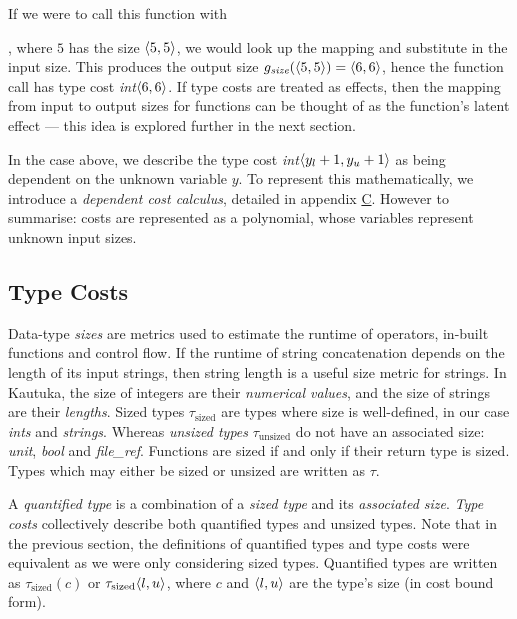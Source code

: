 If we were to call this function with , where \( 5 \) has the size \( \langle{5, 5}\rangle \), we would look up the mapping and substitute in the input size. This produces the output size \( g_{\textit{size}}(\langle{5, 5}\rangle) = \langle{6, 6}\rangle \), hence the function call has type cost \textit{int}\( \langle{6, 6}\rangle \). If type costs are treated as effects, then the mapping from input to output sizes for functions can be thought of as the function's latent effect --- this idea is explored further in the next section.

In the case above, we describe the type cost \textit{int}\( \langle{y_l + 1, y_u + 1}\rangle \) as being dependent on the unknown variable \( y \). To represent this mathematically, we introduce a \textit{dependent cost calculus}, detailed in appendix \hyperref[sec:C]{C}. However to summarise: costs are represented as a polynomial, whose variables represent unknown input sizes.

\subsection{Type Costs}

\label{sec:2.5.2}

Data-type \textit{sizes} are metrics used to estimate the runtime of operators, in-built functions and control flow. If the runtime of string concatenation depends on the length of its input strings, then string length is a useful size metric for strings. In Kautuka, the size of integers are their \textit{numerical values}, and the size of strings are their \textit{lengths}. Sized types \( \tau_\textrm{sized} \) are types where size is well-defined, in our case \textit{ints} and \textit{strings}. Whereas \textit{unsized types} \( \tau_\textrm{unsized} \) do not have an associated size: \textit{unit}, \textit{bool} and \textit{file\_ref}. Functions are sized if and only if their return type is sized. Types which may either be sized or unsized are written as \( \tau \).

A \textit{quantified type} is a combination of a \textit{sized type} and its \textit{associated size}. \textit{Type costs} collectively describe both quantified types and unsized types. Note that in the previous section, the definitions of quantified types and type costs were equivalent as we were only considering sized types. Quantified types are written as \( \tau_\textrm{sized}(c) \) or \( \tau_\textrm{sized}\langle{l, u}\rangle \), where \( c \) and \( \langle{l, u}\rangle \) are the type's size (in cost bound form).

